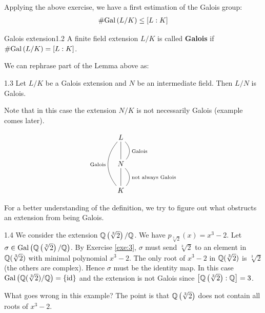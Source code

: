 \documentclass[twoside = false,	%
		headsepline,		%
		parskip = true,
		]{scrbook}						%
\begin{document}
        Applying the above exercise, we have a first estimation of the Galois group:
        \begin{align*}
            \# \mathrm{Gal}\left( L/K\right) \leq [L:K]
        \end{align*}
        
        \begin{definition}{Galois extension}{1.2}
            A finite field extension $L/K$ is called \textbf{Galois} if $\#\mathrm{Gal}\left( L/K\right) = [L:K]$.
        \end{definition}
        We can rephrase part of the Lemma above as:
        
        \begin{corollary}{}{1.3}
            Let $L/K$ be a Galois extension and $N$ be an intermediate field. Then $L/N$ is Galois.
        \end{corollary}
        
        Note that in this case the extension $N/K$ is not necessarily Galois (example comes later).
        
        \begin{equation*}
            \xymatrix
            {
            L\ar@{-}[d]\ar@/_1.5pc/@{-}[dd]_{\text{Galois}}\ar@/^1pc/@{-}[d]^{\text{Galois}} \\
            N\ar@{-}[d]\ar@/^1pc/@{-}[d]^{\text{not always Galois}} \\
            K
            }
        \end{equation*}
        
        For a better understanding of the definition, we try to figure out what obstructs an extension from being Galois.
        \begin{example}{}{1.4}
            We consider the extension $\mathbb Q\left(\sqrt[3]{2}\right)/\mathbb Q$. We have $p_{\sqrt[3]{2}}(x) = x^3-2$. Let $\sigma \in \mathrm{Gal}\left( \mathbb Q\left(\sqrt[3]{2}\right)/\mathbb Q \right)$. By Exercise \ref{exe:3}, $\sigma$ must send $\sqrt[3]{2}$ to an element in $\mathbb Q(\sqrt[3]{2})$ with minimal polynomial $x^3-2$. The only root of $x^3-2$ in $\mathbb Q(\sqrt[3]{2})$ is $\sqrt[3]{2}$ (the others are complex). Hence $\sigma$ must be the identity map. In this case $\mathrm{Gal}\left(  \mathbb Q(\sqrt[3]{2})/\mathbb Q\right) = \{\mathrm{id}\}$ and the extension is not Galois since $\left[\mathbb Q\left(\sqrt[3]{2}\right):\mathbb Q\right]=3$.
        \end{example}
        
        What goes wrong in this example? The point is that $\mathbb Q\left( \sqrt[3]{2}\right)$ does not contain all roots of $x^3-2$.
        
\end{document}
